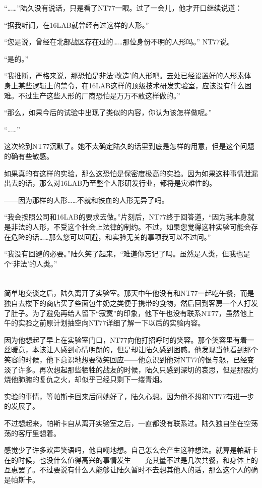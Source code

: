 “……”陆久没有说话，只是看了NT77一眼。过了一会儿，他才开口继续说道：

“据我听闻，在16LAB就曾经有过这样的人形。”

“您是说，曾经在北部战区存在过的……那位身份不明的人形吗。” NT77说。

“是的。”

“我推断，严格来说，那恐怕是非法‘改造’的人形吧。去处已经设置好的人形素体身上某些逻辑上的禁令，在16LAB这样的顶级技术研发实验室，应该没有什么困难。不过生产这些人形的厂商恐怕是万万不敢这样做的。”

“那么，如果今后的试验中出现了类似的内容，你认为该怎样做呢。”

“……”

这次轮到NT77沉默了。她不太确定陆久的话里到底是怎样的用意，但是这个问题的确有些敏感。

如果真的有这样的实验，那么这恐怕是保密度极高的实验。因为如果这种事情泄漏出去的话，那么对16LAB乃至整个人形研发行业，都将是灾难性的。

——因为那样的人形……不就和铁血的人形无异了吗。

“我会按照公司和16LAB的要求去做。”片刻后，NT77终于回答道，“因为我本身就是非法的人形，不受这个社会上法律的制约。不过，如果您觉得这种实验可能会存在危险的话……那么您可以回避，和实验无关的事项我可以不过问。”

“我没有回避的必要。”陆久笑了起来，“难道你忘记了吗。虽然是人类，但我也是个‘非法’的人类。”\section*{}

简单地交谈之后，陆久离开了实验室。那天中午他没有和NT77一起吃午餐，而是独自去楼下的商店买了些面包牛奶之类便于携带的食物，然后回到客房一个人打发了肚子。为了避免再给人留下“寂寞”的印象，他下午也没有联系NT77，虽然他上午的实验之前原计划抽空向NT77详细了解一下以后的实验内容。

因为他想起了早上在实验室门口，NT77向他打招呼时的笑容。那个笑容里有着一丝暖意，本该让人感到心情明朗的，但是却让陆久感到困惑。他发现当他看到那个笑容的时候，他下意识地想要微笑回应——他意识到他对NT77的恨与怒，已经变淡了许多。再次想起那些牺牲的战友的时候，陆久只感到深切的哀思，但是那股灼烧他肺腑的复仇之火，却似乎已经只剩下一缕青烟。

实验的事情，等帕斯卡回来后问她好了，陆久心想。因为他不想和NT77有进一步的发展了。

不过想起来，帕斯卡自从离开实验室之后，一直都没有联系过。陆久独自坐在空荡荡的客厅里想着。

感觉少了许多欢声笑语吗，他自嘲地想。自己怎么会产生这种想法。就算是帕斯卡在的时候，也没什么值得高兴的事情发生——充其量不过是几次共餐，和身体上的互惠罢了。不过要说有什么人能够让陆久暂时不去想其他人的话，那么这个人的确是帕斯卡。

